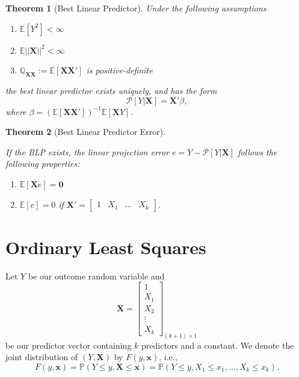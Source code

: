 \documentclass[
]{book}
\providecommand{\tightlist}{%
  \setlength{\itemsep}{0pt}\setlength{\parskip}{0pt}}
\newtheorem{theorem}{Theorem}[chapter]
\theoremstyle{definition}
\theoremstyle{definition}
\theoremstyle{definition}
\theoremstyle{definition}
\theoremstyle{remark}
\begin{document}
\begin{theorem}[Best Linear Predictor]
Under the following assumptions

\begin{enumerate}
\def\labelenumi{\arabic{enumi}.}
\tightlist
\item
  \(\mathbb{E}\left[Y^2\right]<\infty\)
\item
  \(\mathbb{E}||\pmb{X}||^2<\infty\)
\item
  \(\mathbb{Q}_{\pmb{XX}}:=\mathbb{E}\left[\pmb{X}\pmb{X}'\right]\) is positive-definite
\end{enumerate}

the best linear predictor exists uniquely, and has the form
\[
\mathscr{P}[Y|\pmb{X}]=\pmb{X}'\beta,
\]
where \(\beta=\left(\mathbb{E}[\pmb{X}\pmb{X}']\right)^{-1}\mathbb{E}[\pmb{X}Y]\).
\end{theorem}

\begin{theorem}[Best Linear Predictor Error]
\protect\hypertarget{thm:blperror}{}\label{thm:blperror}

If the BLP exists, the linear projection error \(e=Y-\mathscr{P}[Y|\pmb{X}]\) follows the following properties:

\begin{enumerate}
\def\labelenumi{\arabic{enumi}.}
\tightlist
\item
  \(\mathbb{E}[\pmb{X}e]=\pmb{0}\)
\item
  \(\mathbb{E}[e]=0\) if
  \(\pmb{X}'=\begin{bmatrix}1 & X_1 & \ldots & X_k \end{bmatrix}\).
\end{enumerate}

\end{theorem}

\hypertarget{ordinary-least-squares}{%
\chapter{Ordinary Least Squares}\label{ordinary-least-squares}}

Let \(Y\) be our outcome random variable and
\[
\pmb{X}=\begin{bmatrix}
1 \\ X_1 \\ X_2 \\ \vdots \\ X_k
\end{bmatrix}_{(k+1)\times 1}
\]
be our predictor vector containing \(k\) predictors and a constant. We denote the joint distribution of \((Y,\pmb{X})\) by \(F(y,\pmb{x})\), i.e.,
\[
F(y,\pmb{x})=\mathbb{P}(Y\leq y, \pmb{X}\leq\pmb{x})
=\mathbb{P}(Y\leq y,X_1\leq x_1,\ldots,X_k\leq x_k).
\]
\end{document}
